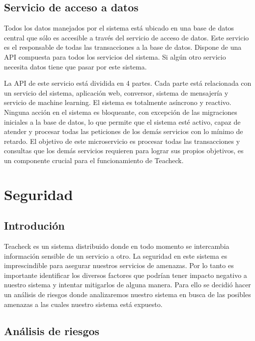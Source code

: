 \subsection{Servicio de acceso a datos}

Todos los datos manejados por el sistema está ubicado en una base de
datos central que sólo es accesible a través del servicio de acceso de
datos. Este servicio es el responsable de todas las transacciones a la
base de datos. Dispone de una API compuesta para todos los servicios
del sistema. Si algún otro servicio necesita datos tiene que pasar por
este sistema.

La API de este servicio está dividida en 4 partes. Cada parte está
relacionada con un servicio del sistema, aplicación web, conversor,
sistema de mensajería y servicio de machine learning. El sistema es
totalmente asíncrono y reactivo. Ninguna acción en el sistema es
bloqueante, con excepción de las migraciones iniciales a la base de
datos, lo que permite que el sistema esté activo, capaz de atender y
procesar todas las peticiones de los demás servicios con lo mínimo de
retardo. El objetivo de este microservicio es procesar todas las
transacciones y consultas que los demás servicios requieren para
lograr sus propios objetivos, es un componente crucial para el
funcionamiento de Teacheck.

\section{Seguridad}

\subsection{Introdución}

Teacheck es un sistema distribuido donde en todo momento se
intercambia información sensible de un servicio a otro. La seguridad
en este sistema es imprescindible para asegurar nuestros servicios de
amenazas. Por lo tanto es importante identificar los diversos factores
que podrían tener impacto negativo a nuestro sistema y intentar
mitigarlos de alguna manera. Para ello se decidió hacer un análisis de
riesgos donde analizaremos nuestro sistema en busca de las posibles
amenazas a las cuales nuestro sistema está expuesto.

\subsection{Análisis de riesgos}

